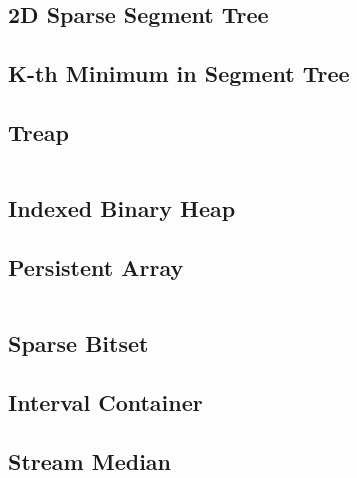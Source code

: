 \subsection{2D Sparse Segment Tree}
\subsection{K-th Minimum in Segment Tree}

\newpage

\subsection{Treap}

\hrulefill \vspace{-\baselineskip}
\begin{multicols}{2}
\inputminted[autogobble,fontsize=\tiny]{C++}{Data Structures/treap.cpp}
\end{multicols}
\vspace{-\baselineskip}
\noindent \hrulefill

\subsection{Indexed Binary Heap}

\newpage

\subsection{Persistent Array}

\hrulefill \vspace{-\baselineskip}
\begin{multicols}{2}
\inputminted[autogobble,fontsize=\tiny]{C++}{Data Structures/persistant_array.cpp}
\end{multicols}
\vspace{-\baselineskip}
\noindent \hrulefill

\subsection{Sparse Bitset}
\subsection{Interval Container}
\subsection{Stream Median}

